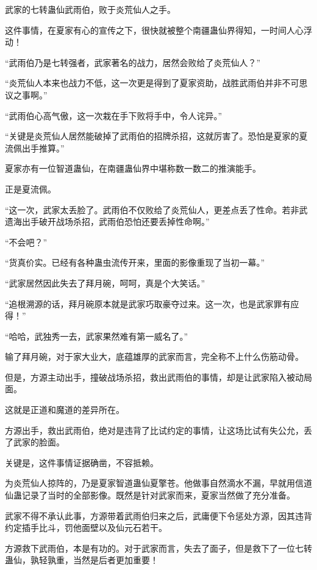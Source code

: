 
\begin{this_body}



武家的七转蛊仙武雨伯，败于炎荒仙人之手。

这件事情，在夏家有心的宣传之下，很快就被整个南疆蛊仙界得知，一时间人心浮动！

“武雨伯乃是七转强者，武家著名的战力，居然会败给了炎荒仙人？”

“炎荒仙人本来也战力不低，这一次更是得到了夏家资助，战胜武雨伯并非不可思议之事啊。”

“武雨伯心高气傲，这一次栽在手下败将手中，令人诧异。”

“关键是炎荒仙人居然能破掉了武雨伯的招牌杀招，这就厉害了。恐怕是夏家的夏流佩出手推算。”

夏家亦有一位智道蛊仙，在南疆蛊仙界中堪称数一数二的推演能手。

正是夏流佩。

“这一次，武家太丢脸了。武雨伯不仅败给了炎荒仙人，更差点丢了性命。若非武遗海出手破开战场杀招，武雨伯恐怕还要丢掉性命啊。”

“不会吧？”

“货真价实。已经有各种蛊虫流传开来，里面的影像重现了当初一幕。”

“武家居然因此失去了拜月碗，呵呵，真是个大笑话。”

“追根溯源的话，拜月碗原本就是武家巧取豪夺过来。这一次，也是武家罪有应得！”

“哈哈，武独秀一去，武家果然难有第一威名了。”

输了拜月碗，对于家大业大，底蕴雄厚的武家而言，完全称不上什么伤筋动骨。

但是，方源主动出手，撞破战场杀招，救出武雨伯的事情，却是让武家陷入被动局面。

这就是正道和魔道的差异所在。

方源出手，救出武雨伯，绝对是违背了比试约定的事情，让这场比试有失公允，丢了武家的脸面。

关键是，这件事情证据确凿，不容抵赖。

为炎荒仙人掠阵的，乃是夏家智道蛊仙夏擎苍。他做事自然滴水不漏，早就用信道仙蛊记录了当时的全部影像。既然是针对武家而来，夏家当然做了充分准备。

武家不得不承认此事，方源带着武雨伯归来之后，武庸便下令惩处方源，因其违背约定插手比斗，罚他面壁以及仙元石若干。

方源救下武雨伯，本是有功的。对于武家而言，失去了面子，但是救下了一位七转蛊仙，孰轻孰重，当然是后者更加重要！


\end{this_body}

